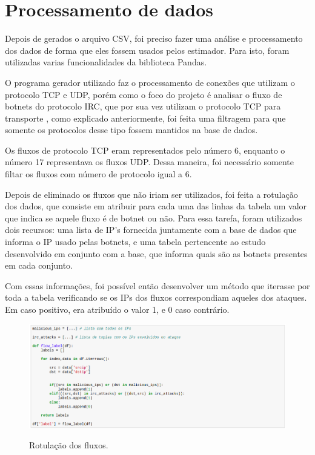 \section{Processamento de dados}

Depois de gerados o arquivo CSV, foi preciso fazer uma análise e processamento dos dados de forma que eles fossem usados pelos estimador. Para isto, foram utilizadas varias funcionalidades da biblioteca Pandas.

O programa gerador utilizado faz o processamento de conexões que utilizam o protocolo TCP e UDP, porém como o foco do projeto é analisar o fluxo de botnets do protocolo IRC, que por sua vez utilizam o protocolo TCP para transporte \cite{livadas2006usilng}, como explicado anteriormente, foi feita uma filtragem para que somente os protocolos desse tipo fossem mantidos na base de dados. 

Os fluxos de protocolo TCP eram representados pelo número 6, enquanto o número 17 representava os fluxos UDP. Dessa maneira, foi necessário somente filtar os fluxos com número de protocolo igual a 6.

Depois de eliminado os fluxos que não iriam ser utilizados, foi feita a rotulação dos dados, que consiste em atribuir para cada uma das linhas da tabela um valor que indica se aquele fluxo é de botnet ou não. Para essa tarefa, foram utilizados dois recursos: uma lista de IP's fornecida juntamente com a base de dados que informa o IP usado pelas botnets, e uma tabela pertencente ao estudo desenvolvido em conjunto com a base, que informa quais são as botnets presentes em cada conjunto.

Com essas informações, foi possível então desenvolver um método que iterasse por toda a tabela verificando se os IPs dos fluxos correspondiam aqueles dos ataques. Em caso positivo, era atribuído o valor 1, e 0 caso contrário.

\begin{figure}[h]
\caption{\small Rotulação dos fluxos.}
\centering
\includegraphics[scale=0.40]{figs/rotulacao-dados.png}
\label{f.rotulacao-dados}
\end{figure}

